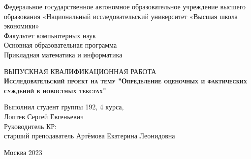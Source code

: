 \begin{titlepage}
    \newpage
    
    {
    \begin{center}
    Федеральное государственное автономное образовательное учреждение высшего образования «Национальный исследовательский университет «Высшая школа экономики»
    \\
    \bigskip
    Факультет компьютерных наук \\
    Основная образовательная программа \\
    Прикладная математика и информатика \\
    \end{center}
    }
    
    \vspace{8em}
    
    \begin{center}
    {\Large ВЫПУСКНАЯ КВАЛИФИКАЦИОННАЯ РАБОТА}\\
    \textsc{\textbf{
    Исследовательский проект на тему
    \linebreak
    "Определение оценочных и фактических суждений в новостных текстах"}}
    \end{center}
    
    \vspace{2em}
    
    {
    \hfill\parbox{16cm}{
    \hspace*{5cm}\hspace*{-5cm}Выполнил студент группы 192, 4 курса,\\
     Лоптев Сергей Евгеньевич\\
     
    \hspace*{5cm}\hspace*{-5cm}Руководитель КР:\\
    старший преподаватель Артёмова Екатерина Леонидовна\\
    
    }
    }
    
    \vspace{\fill}
    
    \begin{center}
    Москва 2023
    \end{center}
    
    \end{titlepage}